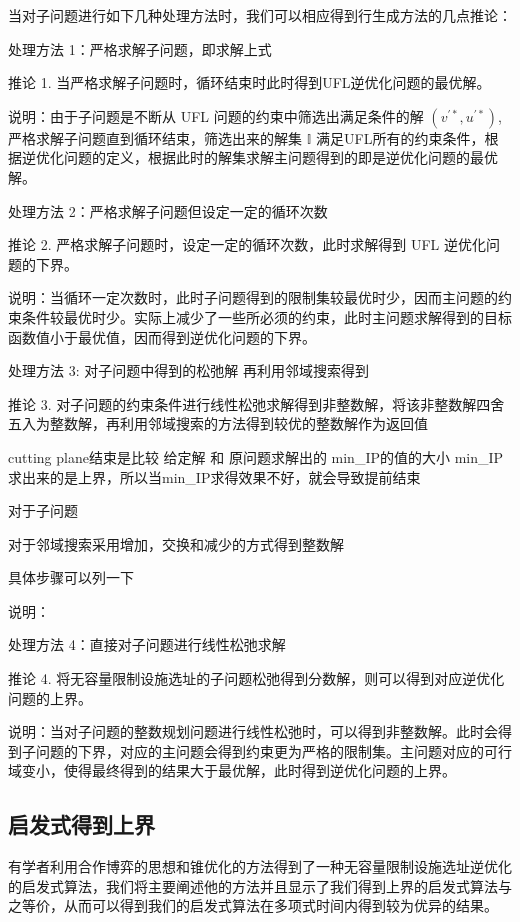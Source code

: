 \documentclass[UTF8]{article}
\begin{document}
当对子问题进行如下几种处理方法时，我们可以相应得到行生成方法的几点推论：

处理方法 1：严格求解子问题，即求解上式

推论 1. 当严格求解子问题时，循环结束时此时得到UFL逆优化问题的最优解。

说明：由于子问题是不断从 UFL 问题的约束中筛选出满足条件的解 $(v^{'*},u^{'*})$, 严格求解子问题直到循环结束，筛选出来的解集 $\mathbb{I}$ 满足UFL所有的约束条件，根据逆优化问题的定义，根据此时的解集求解主问题得到的即是逆优化问题的最优解。

处理方法 2：严格求解子问题但设定一定的循环次数

推论 2. 严格求解子问题时，设定一定的循环次数，此时求解得到 UFL 逆优化问题的下界。

说明：当循环一定次数时，此时子问题得到的限制集较最优时少，因而主问题的约束条件较最优时少。实际上减少了一些所必须的约束，此时主问题求解得到的目标函数值小于最优值，因而得到逆优化问题的下界。

处理方法 3: 对子问题中得到的松弛解 再利用邻域搜索得到

推论 3. 对子问题的约束条件进行线性松弛求解得到非整数解，将该非整数解四舍五入为整数解，再利用邻域搜索的方法得到较优的整数解作为返回值

cutting plane结束是比较 给定解 和 原问题求解出的 min_IP的值的大小
min_IP求出来的是上界，所以当min_IP求得效果不好，就会导致提前结束

对于子问题

对于邻域搜索采用增加，交换和减少的方式得到整数解

具体步骤可以列一下


说明：

处理方法 4：直接对子问题进行线性松弛求解

推论 4. 将无容量限制设施选址的子问题松弛得到分数解，则可以得到对应逆优化问题的上界。

说明：当对子问题的整数规划问题进行线性松弛时，可以得到非整数解。此时会得到子问题的下界，对应的主问题会得到约束更为严格的限制集。主问题对应的可行域变小，使得最终得到的结果大于最优解，此时得到逆优化问题的上界。

\subsection{启发式得到上界}

有学者利用合作博弈的思想和锥优化的方法得到了一种无容量限制设施选址逆优化的启发式算法，我们将主要阐述他的方法并且显示了我们得到上界的启发式算法与之等价，从而可以得到我们的启发式算法在多项式时间内得到较为优异的结果。
\end{document}
